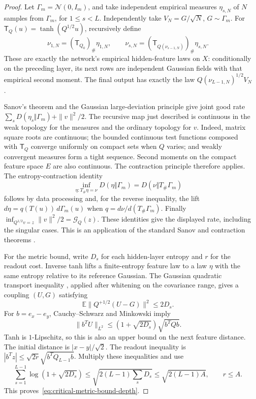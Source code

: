 \begin{proof}
Let $\Gamma_m=\mathcal N(0,I_m)$, and take independent empirical
measures $\eta_{s,N}$ of $N$ samples from $\Gamma_m$, for
$1\le s<L$. Independently take $V_N=G/\sqrt N$, $G\sim\Gamma_m$.
For $\mathsf T_Q(u)=\tanh(Q^{1/2}u)$, recursively define
\[
 \nu_{1,N}=(\mathsf T_{Q_0})_\#\eta_{1,N},\qquad
 \nu_{s,N}=(\mathsf T_{Q(\nu_{s-1,N})})_\#\eta_{s,N}.
\]
These are exactly the network's empirical hidden-feature laws on $X$:
conditionally on the preceding layer, its next rows are independent
Gaussian fields with that empirical second moment. The final output
has exactly the law $Q(\nu_{L-1,N})^{1/2}V_N$.

Sanov's theorem and the Gaussian large-deviation principle give joint
good rate $\sum_s D(\eta_s\Vert\Gamma_m)+\|v\|^2/2$.
The recursive map just described is continuous in the weak topology
for the measures and the ordinary topology for $v$. Indeed, matrix
square roots are continuous; the bounded continuous test functions
composed with $\mathsf T_Q$ converge uniformly on compact sets when
$Q$ varies; and weakly convergent measures form a tight sequence.
Second moments on the compact feature space $E$ are also continuous.
The contraction principle therefore applies. The entropy-contraction
identity
\[
 \inf_{\eta:T_\#\eta=\nu}D(\eta\Vert\Gamma_m)
       =D(\nu\Vert T_\#\Gamma_m)
\]
follows by data processing and, for the reverse inequality, the lift
$d\eta=q(T(u))\,d\Gamma_m(u)$ when
$q=d\nu/d(T_\#\Gamma_m)$. Finally
$\inf_{Q^{1/2}v=z}\|v\|^2/2=\mathcal G_Q(z)$.
These identities give the displayed rate, including the singular cases.
This is an application of the standard Sanov and contraction theorems
\cite{dembozeitouni}.

For the metric bound, write $D_s$ for each hidden-layer entropy and
$r$ for the readout cost. Inverse tanh lifts a finite-entropy feature
law to a law $\eta$ with the same entropy relative to its reference
Gaussian. The Gaussian quadratic transport inequality
\cite{talagrand1996}, applied after whitening on the covariance range,
gives a coupling $(U,G)$ satisfying
\[
 \mathbb E\|Q^{+1/2}(U-G)\|^2\le2D_s.
\]
For $b=e_x-e_y$, Cauchy--Schwarz and Minkowski imply
\[
 \|b^TU\|_{L^2}\le(1+\sqrt{2D_s})\sqrt{b^TQb}.
\]
Tanh is $1$-Lipschitz, so this is also an upper bound on the next
feature distance. The initial distance is $|x-y|/\sqrt2$.
The readout inequality is
$|b^Tz|\le\sqrt{2r}\sqrt{b^TQ_{L-1}b}$.
Multiply these inequalities and use
\[
 \sum_{s=1}^{L-1}\log(1+\sqrt{2D_s})
 \le\sqrt{2(L-1)\sum_sD_s}\le\sqrt{2(L-1)A},\qquad r\le A.
\]
This proves~\eqref{eq:critical-metric-bound-depth}.
\end{proof}

